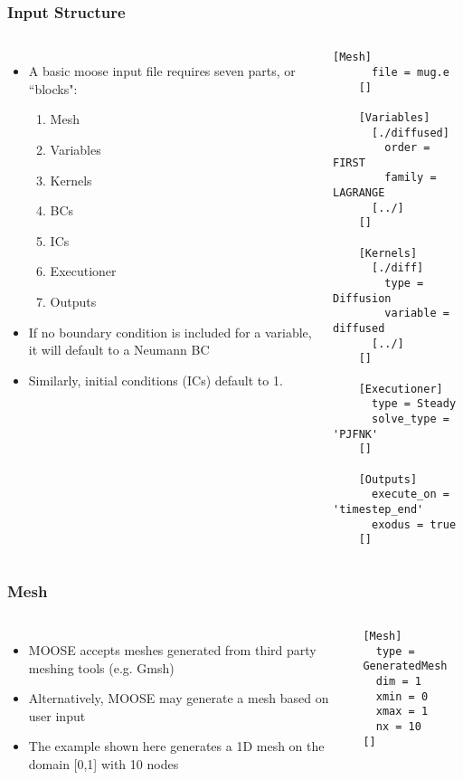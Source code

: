 
	\begin{frame}[fragile]
		\frametitle{Input Structure}
		\begin{columns}
			\begin{itemize}
				\item A basic moose input file requires seven parts, or ``blocks":
				\begin{enumerate}
					\item Mesh
					\item Variables
					\item Kernels
					\item BCs
					\item ICs
					\item Executioner
					\item Outputs
				\end{enumerate}
				\item If no boundary condition is included for a variable, it will default to a Neumann BC
				\item Similarly, initial conditions (ICs) default to 1.
			\end{itemize}
			\begin{Verbatim}[fontsize=\tiny]
	[Mesh]
	  file = mug.e
	[]

	[Variables]
	  [./diffused]
	    order = FIRST
	    family = LAGRANGE
	  [../]
	[]

	[Kernels]
	  [./diff]
	    type = Diffusion
	    variable = diffused
	  [../]
	[]

	[Executioner]
	  type = Steady
	  solve_type = 'PJFNK'
	[]

	[Outputs]
	  execute_on = 'timestep_end'
	  exodus = true
	[]
			\end{Verbatim}
		\end{columns}
	\end{frame}


	\begin{frame}[fragile]
		\frametitle{Mesh}
		\begin{columns}
			\column{0.6\textwidth}
			\begin{itemize}
				\item MOOSE accepts meshes generated from third party meshing tools (e.g. Gmsh)
				\item Alternatively, MOOSE may generate a mesh based on user input
				\item The example shown here generates a 1D mesh on the domain [0,1] with 10 nodes
			\end{itemize}
			\column{0.4\textwidth}
			\begin{Verbatim}[fontsize=\large]
[Mesh]
  type = GeneratedMesh
  dim = 1
  xmin = 0
  xmax = 1
  nx = 10
[]
			\end{Verbatim}
		\end{columns}
	\end{frame}

